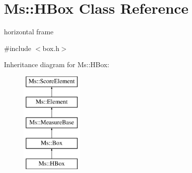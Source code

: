 \hypertarget{class_ms_1_1_h_box}{}\section{Ms\+:\+:H\+Box Class Reference}
\label{class_ms_1_1_h_box}


horizontal frame  




{\ttfamily \#include $<$box.\+h$>$}

Inheritance diagram for Ms\+:\+:H\+Box\+:\begin{figure}[H]
\begin{center}
\leavevmode
\includegraphics[height=5.000000cm]{class_ms_1_1_h_box}
\end{center}
\end{figure}
